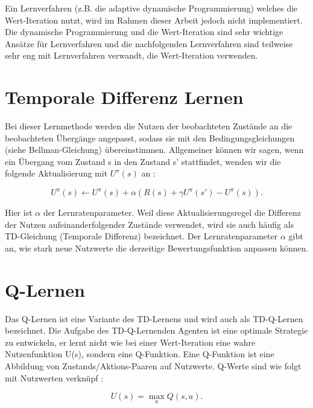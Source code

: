 Ein Lernverfahren (z.B. die adaptive dynamische Programmierung) welches die Wert-Iteration nutzt, wird im Rahmen dieser Arbeit jedoch nicht implementiert. Die dynamische Programmierung und die Wert-Iteration sind sehr wichtige Ansätze für Lernverfahren und die nachfolgenden Lernverfahren sind teilweise sehr eng mit Lernverfahren verwandt, die Wert-Iteration verwenden. \\

\section{Temporale Differenz Lernen}
\label{sec:Temporale Differenz Lernen}
Bei dieser Lernmethode werden die Nutzen der beobachteten Zustände an die beobachteten Übergänge angepasst, sodass sie mit den Bedingungsgleichungen (siehe Bellman-Gleichung) übereinstimmen. Allgemeiner können wir sagen, wenn ein Übergang vom Zustand s in den Zustand s' stattfindet, wenden wir die folgende Aktualisierung mit $U^\pi(s)$ an \cite[966\psq]{Russell}:

\begin{equation}
\label{eq:Aktualisierungsgleichung temporale Differenz}
U^\pi(s) \leftarrow U^\pi(s) + \alpha(R(s) + \gamma U^\pi(s') - U^\pi(s)).
\end{equation}

Hier ist $\alpha$ der Lernratenparameter. Weil diese Aktualisierungsregel die Differenz der Nutzen aufeinanderfolgender Zustände verwendet, wird sie auch häufig als TD-Gleichung (Temporale Differenz) bezeichnet. Der Lernratenparameter $\alpha$ gibt an, wie stark neue Nutzwerte die derzeitige Bewertungsfunktion anpassen können. 

\section{Q-Lernen}
\label{sec:Q-Lernen}
Das Q-Lernen ist eine Variante des TD-Lernens und wird auch als TD-Q-Lernen bezeichnet. Die Aufgabe des TD-Q-Lernenden Agenten ist eine optimale Strategie zu entwickeln, er lernt nicht wie bei einer Wert-Iteration eine wahre Nutzenfunktion U(s), sondern eine Q-Funktion. Eine Q-Funktion ist eine Abbildung von Zustands/Aktions-Paaren auf Nutzwerte. Q-Werte sind wie folgt mit Nutzwerten verknüpf \cite[973]{Russell}:

\begin{equation}
\label{eq:Nutzenwerte und Q-Werte}
U(s) = \max_a Q(s,a).
\end{equation}

